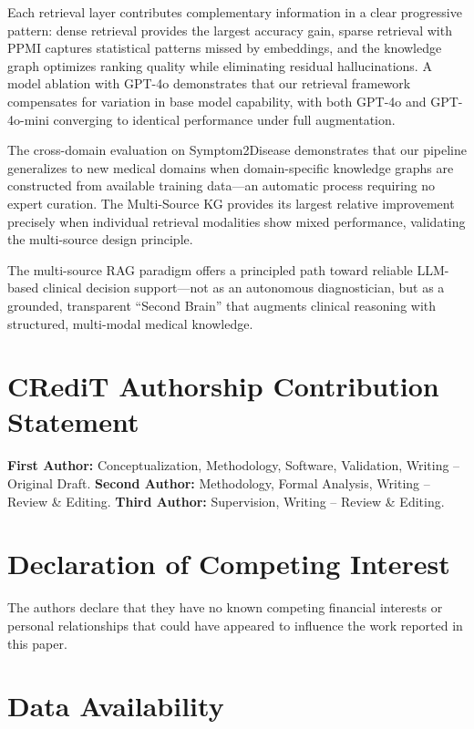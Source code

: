 \documentclass[review]{elsarticle}
\begin{document}
Each retrieval layer contributes complementary information in a clear progressive pattern: dense retrieval provides the largest accuracy gain, sparse retrieval with PPMI captures statistical patterns missed by embeddings, and the knowledge graph optimizes ranking quality while eliminating residual hallucinations. A model ablation with GPT-4o demonstrates that our retrieval framework compensates for variation in base model capability, with both GPT-4o and GPT-4o-mini converging to identical performance under full augmentation.

The cross-domain evaluation on Symptom2Disease demonstrates that our pipeline generalizes to new medical domains when domain-specific knowledge graphs are constructed from available training data---an automatic process requiring no expert curation. The Multi-Source KG provides its largest relative improvement precisely when individual retrieval modalities show mixed performance, validating the multi-source design principle.

The multi-source RAG paradigm offers a principled path toward reliable LLM-based clinical decision support---not as an autonomous diagnostician, but as a grounded, transparent ``Second Brain'' that augments clinical reasoning with structured, multi-modal medical knowledge.

\section*{CRediT Authorship Contribution Statement}

\textbf{First Author:} Conceptualization, Methodology, Software, Validation, Writing -- Original Draft.
\textbf{Second Author:} Methodology, Formal Analysis, Writing -- Review \& Editing.
\textbf{Third Author:} Supervision, Writing -- Review \& Editing.

\section*{Declaration of Competing Interest}

The authors declare that they have no known competing financial interests or personal relationships that could have appeared to influence the work reported in this paper.

\section*{Data Availability}
\end{document}
